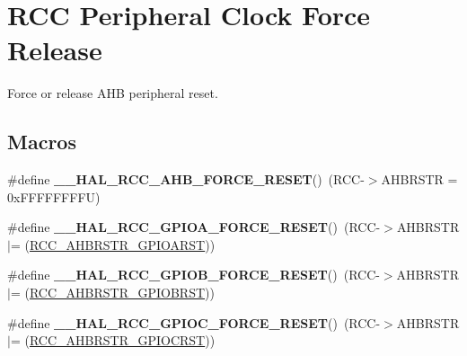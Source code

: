 \hypertarget{group___r_c_c___peripheral___clock___force___release}{\section{R\-C\-C Peripheral Clock Force Release}
\label{group___r_c_c___peripheral___clock___force___release}
}


Force or release A\-H\-B peripheral reset.  


\subsection*{Macros}
\begin{DoxyCompactItemize}
\item 
\hypertarget{group___r_c_c___peripheral___clock___force___release_ga70ac7ee64a7f1911e3c89d54efb13695}{\#define {\bfseries \-\_\-\-\_\-\-H\-A\-L\-\_\-\-R\-C\-C\-\_\-\-A\-H\-B\-\_\-\-F\-O\-R\-C\-E\-\_\-\-R\-E\-S\-E\-T}()~(R\-C\-C-\/$>$A\-H\-B\-R\-S\-T\-R = 0x\-F\-F\-F\-F\-F\-F\-F\-F\-U)}\label{group___r_c_c___peripheral___clock___force___release_ga70ac7ee64a7f1911e3c89d54efb13695}

\item 
\hypertarget{group___r_c_c___peripheral___clock___force___release_gab329bd497cccffd979bcca9fd42bbc79}{\#define {\bfseries \-\_\-\-\_\-\-H\-A\-L\-\_\-\-R\-C\-C\-\_\-\-G\-P\-I\-O\-A\-\_\-\-F\-O\-R\-C\-E\-\_\-\-R\-E\-S\-E\-T}()~(R\-C\-C-\/$>$A\-H\-B\-R\-S\-T\-R $\vert$= (\hyperlink{group___peripheral___registers___bits___definition_ga327f966b6e8dc82dc0ac950539ce0407}{R\-C\-C\-\_\-\-A\-H\-B\-R\-S\-T\-R\-\_\-\-G\-P\-I\-O\-A\-R\-S\-T}))}\label{group___r_c_c___peripheral___clock___force___release_gab329bd497cccffd979bcca9fd42bbc79}

\item 
\hypertarget{group___r_c_c___peripheral___clock___force___release_ga3b89be9638638ffce3ebd4f08a3b64cf}{\#define {\bfseries \-\_\-\-\_\-\-H\-A\-L\-\_\-\-R\-C\-C\-\_\-\-G\-P\-I\-O\-B\-\_\-\-F\-O\-R\-C\-E\-\_\-\-R\-E\-S\-E\-T}()~(R\-C\-C-\/$>$A\-H\-B\-R\-S\-T\-R $\vert$= (\hyperlink{group___peripheral___registers___bits___definition_gab07dc17b79c908bdbf9cf196947d0035}{R\-C\-C\-\_\-\-A\-H\-B\-R\-S\-T\-R\-\_\-\-G\-P\-I\-O\-B\-R\-S\-T}))}\label{group___r_c_c___peripheral___clock___force___release_ga3b89be9638638ffce3ebd4f08a3b64cf}

\item 
\hypertarget{group___r_c_c___peripheral___clock___force___release_ga6e6a20fa8e0d7b3ebfdce26f6b1a1ed0}{\#define {\bfseries \-\_\-\-\_\-\-H\-A\-L\-\_\-\-R\-C\-C\-\_\-\-G\-P\-I\-O\-C\-\_\-\-F\-O\-R\-C\-E\-\_\-\-R\-E\-S\-E\-T}()~(R\-C\-C-\/$>$A\-H\-B\-R\-S\-T\-R $\vert$= (\hyperlink{group___peripheral___registers___bits___definition_ga5b837c7b81c1a4b8f986c23b7c5b5afa}{R\-C\-C\-\_\-\-A\-H\-B\-R\-S\-T\-R\-\_\-\-G\-P\-I\-O\-C\-R\-S\-T}))}\label{group___r_c_c___peripheral___clock___force___release_ga6e6a20fa8e0d7b3ebfdce26f6b1a1ed0}


\end{DoxyCompactItemize}
